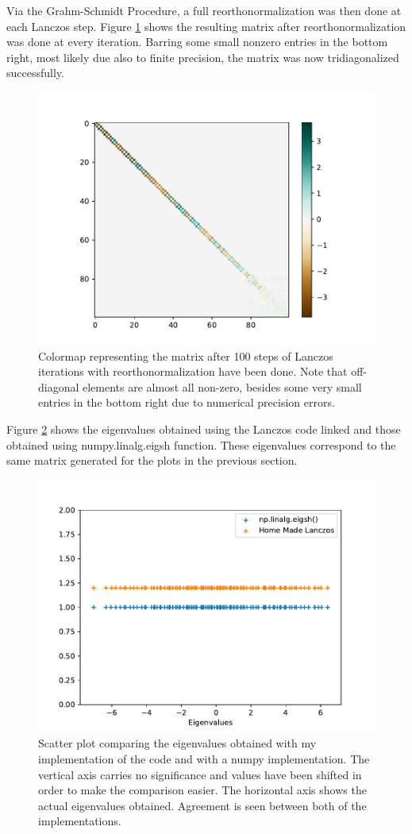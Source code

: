 %
Via the Grahm-Schmidt Procedure, a full reorthonormalization was then done at each Lanczos step. Figure \ref{fig:triDiag} shows the resulting matrix after reorthonormalization was done at every iteration. 
Barring some small nonzero entries in the bottom right, most likely due also to finite precision, the matrix was now tridiagonalized successfully.
%
\begin{figure}[h!]
\begin{center}
\includegraphics[width=0.7\columnwidth]{Images/Lanczos/T_yesReortho.pdf}
\end{center}
\caption{Colormap representing the matrix after 100 steps of Lanczos iterations with reorthonormalization have been done. Note that off-diagonal elements are almost all non-zero, besides some very small entries in the bottom right due to numerical precision errors.}
\label{fig:triDiag}
\end{figure}
%

Figure \ref{fig:evals} shows the eigenvalues obtained using the Lanczos code linked and those obtained using numpy.linalg.eigsh function. These eigenvalues correspond to the same matrix generated for the plots in the previous section.

\begin{figure}[t!]
\begin{center}
\includegraphics[width=0.7\columnwidth]{Images/Lanczos/eigenvaluesComparison.pdf}
\end{center}
\caption{Scatter plot comparing the eigenvalues obtained with my implementation of the code and with a numpy implementation. The vertical axis carries no significance and values have been shifted in order to make the comparison easier. The horizontal axis shows the actual eigenvalues obtained. Agreement is seen between both of the implementations.}
\label{fig:evals}
\end{figure}